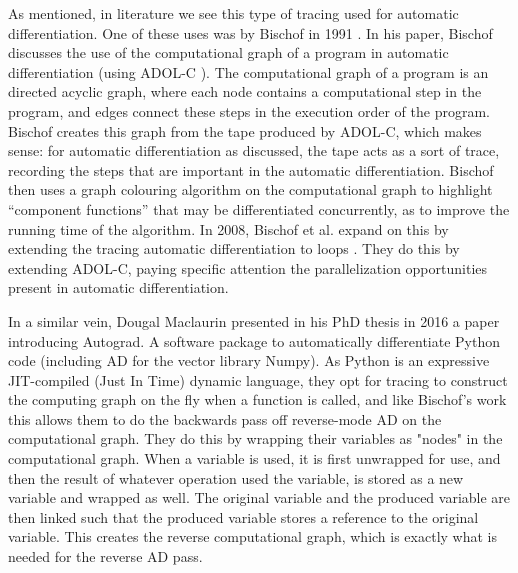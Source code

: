         As mentioned, in literature we see this type of tracing used for automatic differentiation.
        One of these uses was by Bischof in 1991 \cite{bischof1991issues}.
        In his paper, Bischof discusses the use of the computational graph of a program in automatic differentiation (using ADOL-C \cite{griewank1996algorithm}).
        The computational graph of a program is an directed acyclic graph, where each node contains a computational step in the program, and edges connect these steps in the execution order of the program.
        Bischof creates this graph from the tape produced by ADOL-C, which makes sense: for automatic differentiation as discussed, the tape acts as a sort of trace, recording the steps that are important in the automatic differentiation.
        Bischof then uses a graph colouring algorithm on the computational graph to highlight ``component functions'' that may be differentiated concurrently, as to improve the running time of the algorithm.
        In 2008, Bischof et al. expand on this by extending the tracing automatic differentiation to loops \cite{bischof2008parallel}.
        They do this by extending ADOL-C, paying specific attention the parallelization opportunities present in automatic differentiation.

        In a similar vein, Dougal Maclaurin presented in his PhD thesis in 2016 \cite{maclaurin2016modeling} a paper introducing Autograd.
        A software package to automatically differentiate Python code (including AD for the vector library Numpy).
        As Python is an expressive JIT-compiled (Just In Time) dynamic language, they opt for tracing to construct the computing graph on the fly when a function is called, and like Bischof's work this allows them to do the backwards pass off reverse-mode AD on the computational graph.
        They do this by wrapping their variables as "nodes" in the computational graph.
        When a variable is used, it is first unwrapped for use, and then the result of whatever operation used the variable, is stored as a new variable and wrapped as well.
        The original variable and the produced variable are then linked such that the produced variable stores a reference to the original variable.
        This creates the reverse computational graph, which is exactly what is needed for the reverse AD pass.

